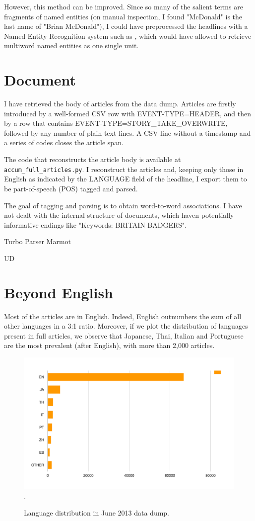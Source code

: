 \documentclass[12pt]{article}%
\begin{document}
However, this method can be improved. Since so many of the salient terms are fragments of named entities (on manual inspection, I found "McDonald" is the last name of "Brian McDonald"), I could have preprocessed the headlines with a Named Entity Recognition system such as \cite{finkel2005incorporating}, which would have allowed to retrieve multiword named entities as one single unit. 

\section{Document}

I have retrieved the body of articles from the data dump. Articles are firstly introduced by a well-formed CSV row with EVENT-TYPE=HEADER, and then by a row that contains EVENT-TYPE=STORY\_TAKE\_OVERWRITE, followed by any number of plain text lines. A CSV line without a timestamp and a series of codes closes the article span.

The code that reconstructs the article body is available at \texttt{accum\_full\_articles.py}. I reconstruct the articles and, keeping only those in English as indicated by the LANGUAGE field of the headline, I export them to be part-of-speech (POS) tagged and parsed.

The goal of tagging and parsing is to obtain word-to-word associations. I have not dealt with the internal structure of documents, which haven potentially informative endings like "Keywords: BRITAIN BADGERS".

Turbo Parser \cite{martins13}
Marmot \cite{mueller13}

UD \cite{Nivre16}

\section{Beyond English}
Most of the articles are in English. Indeed, English outnumbers the sum of all other languages in a 3:1 ratio. Moreover, if we plot the distribution of languages present in full articles, we observe that Japanese, Thai, Italian and Portuguese are the most prevalent (after English), with more than 2,000 articles. 
\begin{figure}
 \centering
\includegraphics[width=400pt]{langs}.
 \caption{Language distribution in June 2013 data dump.}
 \label{figure:langs}
\end{figure}
\end{document}
